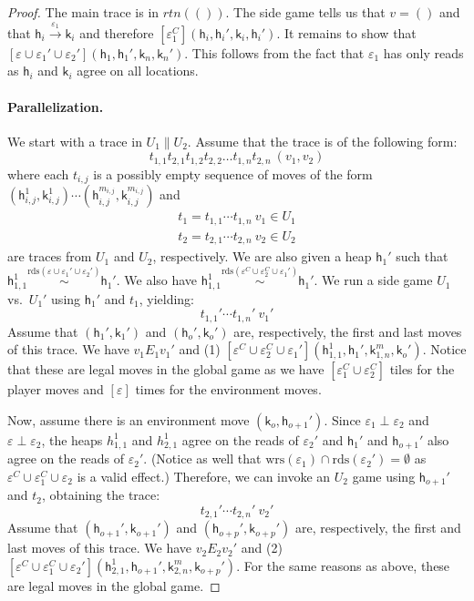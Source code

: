 \documentclass[nocopyrightspace,preprint]{sigplanconf}
\newcommand{\keywd}[1]{\mathtt{#1}}
\newcommand{\unitval}{\keywd{()}}
\newcommand{\rdsin}[1]{\mathrm{rds}({#1})}
\newcommand{\wrsin}[1]{\mathrm{wrs}({#1})}
\newcommand{\mypar}[2]{#1 \| #2}
\newcommand{\eff}{\varepsilon}
\newcommand\heap{\ensuremath{\mathsf{h}}\xspace}
\newcommand\h{\heap}
\renewcommand\k{\ensuremath{\mathsf{k}}\xspace}
\newcommand\rloc[3]{\ensuremath{#1 \stackrel{#3}{\sim} #2}}
\newcommand\gloc[3]{\ensuremath{#1 \xrightarrow{#3}#2}}
\begin{document}
\begin{proof}
The main trace is in $\textit{rtn}(\unitval)$. The side game tells us that 
 $v = \unitval$ and that $\gloc{\h_i}{\k_i}{\eff_1}$ and therefore
$[\eff_1^C](\h_i,\h_i',\k_i,\h_i')$. It remains to
show that $[\eff \cup \eff_1'\cup \eff_2'](\h_1,\h_1',\k_n,\k_n')$. This follows from the
fact that $\eff_1$ has only reads as $\h_i$ and $\k_i$ agree on all
locations.














\paragraph{Parallelization.}








We start with a trace in $\mypar{U_1}{U_2}$. Assume that the trace is of the following form:
\[
t_{1,1} t_{2,1} t_{1,2} t_{2,2} \ldots t_{1,n} t_{2,n} \ (v_1,v_2)
\]
where each $t_{i,j}$ is a possibly empty sequence of moves of the form $(\h_{i,j}^1,\k_{i,j}^1) \cdots (\h_{i,j}^{m_{i,j}},\k_{i,j}^{m_{i,j}})$ and
\[
  \begin{array}{l}
  t_1 = t_{1,1} \cdots t_{1,n} \ v_1 \in U_1\\
  t_2 = t_{2,1} \cdots t_{2,n} \ v_2 \in U_2
  \end{array}
\]
are traces from $U_1$ and $U_2$, respectively. We are also given a heap $\h_1'$ such that $\rloc{\h_{1,1}^1}{\h_1'}{\rdsin{\eff \cup \eff_1' \cup \eff_2'}}$. We also have $\rloc{\h_{1,1}^1}{\h_1'}{\rdsin{\eff^C \cup \eff_2^C \cup \eff_1'}}$. We run a side game $U_1$ vs.\ $U_1'$ 
using $\h_1'$ and $t_1$, yielding:
\[
 t_{1,1}' \cdots t_{1,n}' \ v_1'  
\]
 Assume that $(\h_1',\k_1')$ and $(\h_o',\k_o')$ are, respectively, the first and last moves of this trace. We have $v_1 E_1 v_1'$ and (1) $[\eff^C \cup \eff_2^C \cup \eff_1'](\h_{1,1}^1,\h_1',\k_{1,n}^m,\k_o')$. Notice that these are legal moves in the global game as we have $[\eff_1^C \cup \eff_2^C]$ tiles for the player moves and $[\eff]$ times for the environment moves.

 Now, assume there is an environment move $(\k_o,\h_{o+1}')$.  Since $\eff_1 \perp \eff_2$ and $\eff \perp \eff_2$, the heaps $h_{1,1}^1$ and $h_{2,1}^1$ agree on the reads of $\eff_2'$ and $\h_1'$ and $\h_{o+1}'$ also agree on the reads of $\eff_2'$. (Notice as well that $\wrsin{\eff_1} \cap \rdsin{\eff_2'} = \emptyset$ as $\eff^C \cup \eff_1^C \cup \eff_2$ is a valid effect.) Therefore, we can invoke an $U_2$ game using $\h_{o+1}'$ and $t_2$, obtaining the trace:  
\[
 t_{2,1}' \cdots t_{2,n}' \ v_2'  
\]
Assume that $(\h_{o+1}',\k_{o+1}')$ and $(\h_{o+p}',\k_{o+p}')$ are, respectively, the first and last moves of this trace. We have $v_2 E_2 v_2'$ and (2) $[\eff^C \cup \eff_1^C \cup \eff_2'](\h_{2,1}^1,\h_{o+1}',\k_{2,n}^m,\k_{o+p}')$. For the same reasons as above, these are legal moves in the global game.


\end{proof}
\end{document}
